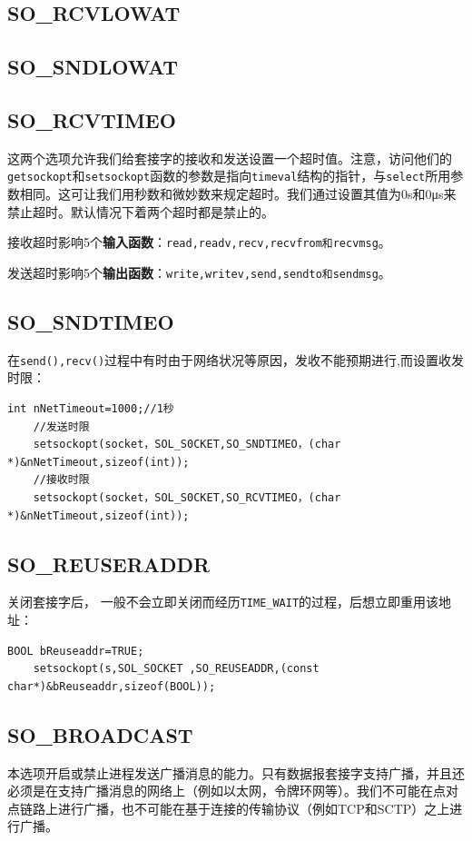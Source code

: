 \documentclass[UTF8,a4paper,12pt]{ctexbook}
\begin{document}
		\subsection{SO\_RCVLOWAT}
		\subsection{SO\_SNDLOWAT}
		\subsection{SO\_RCVTIMEO}
			这两个选项允许我们给套接字的接收和发送设置一个超时值。注意，访问他们的\verb|getsockopt|和\verb|setsockopt|函数的参数是指向\verb|timeval|结构的指针，与\verb|select|所用参数相同。这可让我们用秒数和微妙数来规定超时。我们通过设置其值为0s和0μs来禁止超时。默认情况下着两个超时都是禁止的。
			
			接收超时影响5个\textbf{输入函数}：\verb|read,readv,recv,recvfrom和recvmsg|。
			
			发送超时影响5个\textbf{输出函数}：\verb|write,writev,send,sendto和sendmsg|。
			
		\subsection{SO\_SNDTIMEO}
			在\verb|send(),recv()|过程中有时由于网络状况等原因，发收不能预期进行,而设置收发时限：
			\begin{lstlisting}[frame=L]
	int nNetTimeout=1000;//1秒
	//发送时限
	setsockopt(socket，SOL_S0CKET,SO_SNDTIMEO，(char *)&nNetTimeout,sizeof(int));
	//接收时限
	setsockopt(socket，SOL_S0CKET,SO_RCVTIMEO，(char *)&nNetTimeout,sizeof(int));
			\end{lstlisting}
			
		\subsection{SO\_REUSERADDR}
			关闭套接字后， 一般不会立即关闭而经历\verb|TIME_WAIT|的过程，后想立即重用该地址：
			\begin{lstlisting}[frame=L]
	BOOL bReuseaddr=TRUE;
	setsockopt(s,SOL_SOCKET ,SO_REUSEADDR,(const char*)&bReuseaddr,sizeof(BOOL));
			\end{lstlisting}
			
		\subsection{SO\_BROADCAST}
			本选项开启或禁止进程发送广播消息的能力。只有数据报套接字支持广播，并且还必须是在支持广播消息的网络上（例如以太网，令牌环网等）。我们不可能在点对点链路上进行广播，也不可能在基于连接的传输协议（例如TCP和SCTP）之上进行广播。
			
\end{document}

